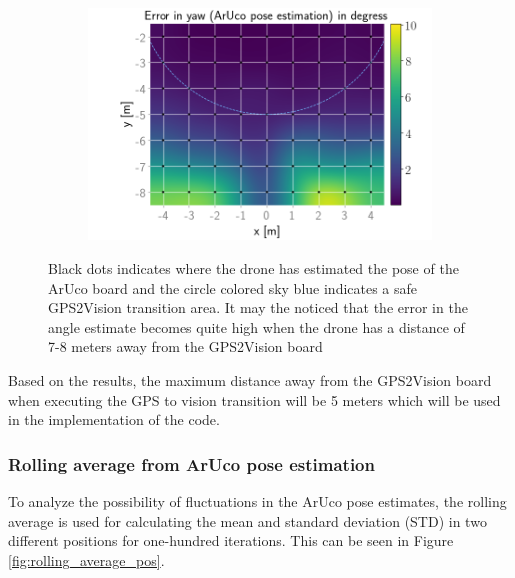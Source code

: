 \documentclass[../Head/report.tex]{subfiles}
\begin{document}
\begin{figure}[H]
    \hspace{-0.9em}
    \begin{subfigure}[t]{.337\textwidth}
        \centering
        \includegraphics[width=\textwidth]{../Figures/GPS2Vision_pose_estimation_test/test1_aruco_board_width_0.2_space_0.1/aruco_pose_estimation_error_yaw.png}
        \caption{}
        \label{fig:GPS2Vision_pose_estimation_test1_error_yaw}
    \end{subfigure}
    \caption{Black dots indicates where the drone has estimated the pose of the ArUco board and the circle colored sky blue indicates a safe GPS2Vision transition area. It may the noticed that the error in the angle estimate becomes quite high when the drone has a distance of 7-8 meters away from the GPS2Vision board}
    \label{fig:GPS2Vision_pose_estimation_test1_error_ori}
\end{figure}

Based on the results, the maximum distance away from the GPS2Vision board when executing the GPS to vision transition will be 5 meters which will be used in the implementation of the code.

\subsubsection{Rolling average from ArUco pose estimation}
\label{sec:rolling_average_aruco_pose_estimation}

To analyze the possibility of fluctuations in the ArUco pose estimates, the rolling average is used for calculating the mean and standard deviation (STD) in two different positions for one-hundred iterations. This can be seen in Figure \ref{fig:rolling_average_pos}. 
\end{document}
